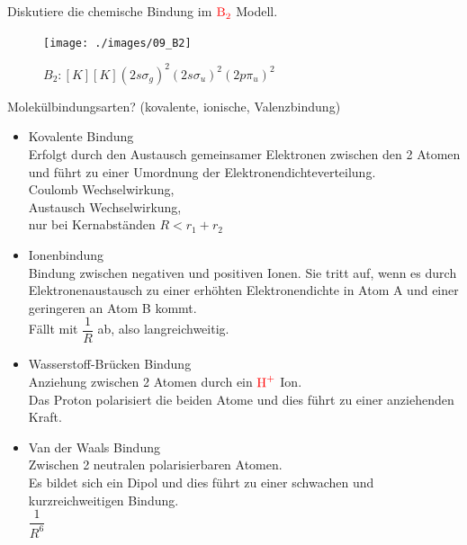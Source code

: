 \documentclass[a5paper,12pt,ngerman,grid=front %
,print
]{kartei}
\let\oldce\ce
\renewcommand*{\ce}[1]{\begingroup\color{red}\oldce{#1}\endgroup}
\begin{document}
	\begin{karte}{
		Diskutiere die chemische Bindung im $\ce{B2}$ Modell.
		}
		
		\begin{figure}[htbp]
			\centering
			\texttt{[image: ./images/09\_B2]}
			\caption[Li2]{$B_2: [K][K]  (2s \sigma_g)^2 (2s \sigma_u)^2  (2p \pi_u )^2   $}
		\end{figure}
		
	\end{karte}


	\begin{karte}{
		Molekülbindungsarten? (kovalente, ionische, Valenzbindung)
		}
		
		\begin{itemize}
			\item Kovalente Bindung \\
				Erfolgt durch den Austausch gemeinsamer Elektronen zwischen den 2 Atomen und führt zu einer Umordnung der Elektronendichteverteilung. \\
				Coulomb Wechselwirkung, \\
				Austausch Wechselwirkung, \\
				nur bei Kernabständen $ R<r_1+r_2 $
				
			\item Ionenbindung \\
				Bindung zwischen negativen und positiven Ionen. Sie tritt auf, wenn es durch Elektronenaustausch zu einer erhöhten Elektronendichte in Atom A und einer geringeren an Atom B kommt.\\
				Fällt mit $ \dfrac{1}{R} $ ab, also langreichweitig.
			\item Wasserstoff-Brücken Bindung \\
				Anziehung zwischen 2 Atomen durch ein $\ce{H+}$ Ion. \\
				Das Proton polarisiert die beiden Atome und dies führt zu einer anziehenden Kraft.
			\item Van der Waals Bindung \\
				Zwischen 2 neutralen polarisierbaren Atomen.\\
				Es bildet sich ein Dipol und dies führt zu einer schwachen und kurzreichweitigen Bindung. \\
				$\dfrac{1}{R^6}$
		\end{itemize}
		
	\end{karte}
\end{document}
